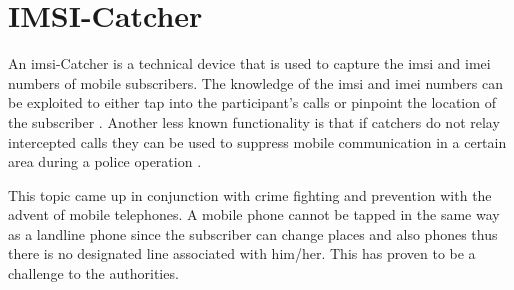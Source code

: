 \section{IMSI-Catcher}
\label{sec:catcher}
An \gls{imsi}-Catcher is a technical device that is used to capture the \gls{imsi} and \gls{imei} numbers of mobile subscribers.
The knowledge of the \gls{imsi} and \gls{imei} numbers can be exploited to either tap into the participant's calls or pinpoint the location of the subscriber \cite{fox}.
Another less known functionality is that if catchers do not relay intercepted calls they can be used to suppress mobile communication in a certain area \eg during a police operation \cite{imsi_wiki}.

This topic came up in conjunction with crime fighting and prevention with the advent of mobile telephones.
A mobile phone cannot be tapped in the same way as a landline phone since the subscriber can change places and also phones thus there is no designated line associated with him/her.
This has proven to be a challenge to the authorities.

